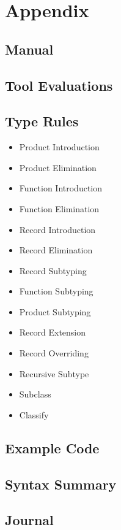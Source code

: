 
\appendix
\part{Appendix}

\chapter{Manual}

\chapter{Tool Evaluations}


\chapter{Type Rules}
\begin{itemize}
\item Product Introduction
\item Product Elimination
\item Function Introduction
\item Function Elimination
\item Record Introduction
\item Record Elimination
\item Record Subtyping
\item Function Subtyping
\item Product Subtyping
\item Record Extension
\item Record Overriding
\item Recursive Subtype
\item Subclass
\item Classify
\end{itemize}

\chapter{Example Code}
\label{ctr:exampleCode}

\chapter{Syntax Summary}

\chapter{Journal}


